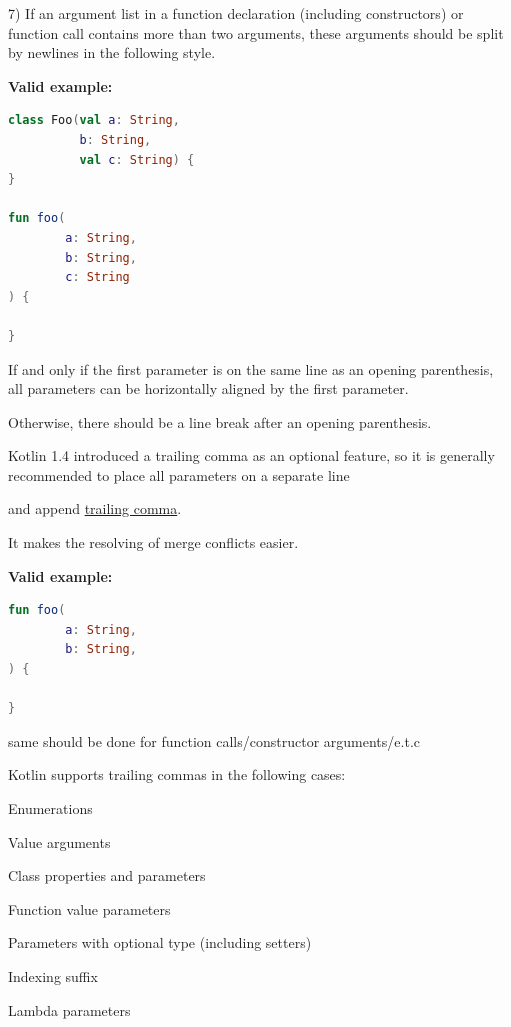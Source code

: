 7)  If an argument list in a function declaration (including constructors) or function call contains more than two arguments, these arguments should be split by newlines in the following style.



\textbf{Valid example:} 

\begin{lstlisting}[language=Kotlin]
class Foo(val a: String,
          b: String,
          val c: String) {
}

fun foo(
        a: String,
        b: String,
        c: String
) {

}
\end{lstlisting}


If and only if the first parameter is on the same line as an opening parenthesis, all parameters can be horizontally aligned by the first parameter.

Otherwise, there should be a line break after an opening parenthesis.



Kotlin 1.4 introduced a trailing comma as an optional feature, so it is generally recommended to place all parameters on a separate line

and append \href{https://kotlinlang.org/docs/reference/whatsnew14.html#trailing-comma}{trailing comma}.

It makes the resolving of merge conflicts easier.



\textbf{Valid example:} 

\begin{lstlisting}[language=Kotlin]
fun foo(
        a: String,
        b: String,
) {

}
\end{lstlisting}


same should be done for function calls/constructor arguments/e.t.c



Kotlin supports trailing commas in the following cases:



Enumerations

Value arguments

Class properties and parameters

Function value parameters

Parameters with optional type (including setters)

Indexing suffix

Lambda parameters

